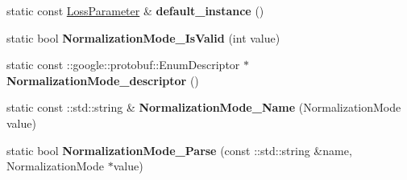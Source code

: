 \begin{DoxyCompactItemize}
static const \mbox{\hyperlink{classcaffe_1_1_loss_parameter}{Loss\+Parameter}} \& {\bfseries default\+\_\+instance} ()
\item 
\mbox{\label{classcaffe_1_1_loss_parameter_ac00c1485d27b372cdda9f919c56886a6}} 
static bool {\bfseries Normalization\+Mode\+\_\+\+Is\+Valid} (int value)
\item 
\mbox{\label{classcaffe_1_1_loss_parameter_ac799971e862be927b7fa88c0629935ec}} 
static const \+::google\+::protobuf\+::\+Enum\+Descriptor $\ast$ {\bfseries Normalization\+Mode\+\_\+descriptor} ()
\item 
\mbox{\label{classcaffe_1_1_loss_parameter_a6b00a95e58e6f5c349e6b5c8baaa3844}} 
static const \+::std\+::string \& {\bfseries Normalization\+Mode\+\_\+\+Name} (Normalization\+Mode value)
\item 
\mbox{\label{classcaffe_1_1_loss_parameter_ac4ab06a8bb0ae5c425e4a735970ccdef}} 
static bool {\bfseries Normalization\+Mode\+\_\+\+Parse} (const \+::std\+::string \&name, Normalization\+Mode $\ast$value)
\end{DoxyCompactItemize}
